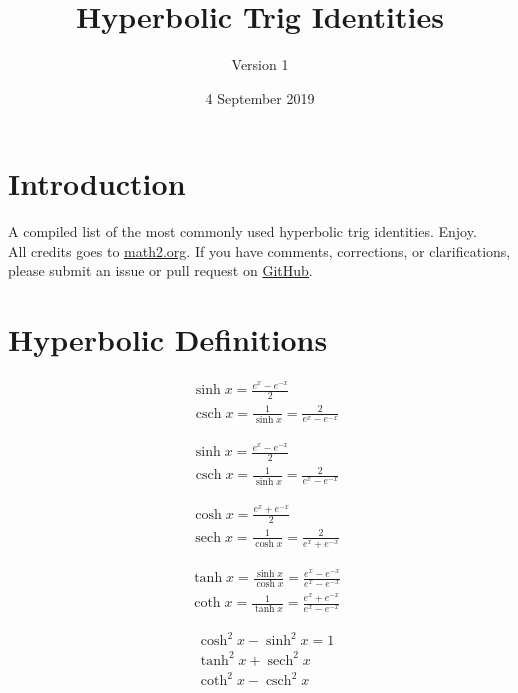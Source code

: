 \documentclass[11pt]{article}
\title{Hyperbolic Trig Identities}
\author{Version 1}
\date{4 September 2019}
\begin{document}
\maketitle

\section{Introduction}
A compiled list of the most commonly used hyperbolic trig identities. Enjoy. \\

All credits goes to \href{http://math2.org/math/trig/hyperbolics.htm}{math2.org}. If you have comments, corrections, or clarifications, please submit an issue or pull request on \href{https://github.com/chemclub/calculus}{GitHub}.


\section{Hyperbolic Definitions}

\begin{align*}
& \sinh x = \frac{e^x-e^{-x}}{2} \\ 
& \operatorname{csch}x = \frac{1}{\sinh x} = \frac{2}{e^x-e^{-x}}
\end{align*}

\begin{align*}
& \sinh x = \frac{e^x-e^{-x}}{2} \\
& \operatorname{csch}x = \frac{1}{\sinh x} = \frac{2}{e^x-e^{-x}}
\end{align*}

\begin{align*}
& \cosh x = \frac{e^x+e^{-x}}{2} \\
& \operatorname{sech}x = \frac{1}{\cosh x} = \frac{2}{e^x+e^{-x}}
\end{align*}

\begin{align*}
& \tanh x = \frac{\sinh x}{\cosh x} = \frac{e^x-e^{-x}}{e^x-e^{-x}} \\
& \operatorname{coth}x = \frac{1}{\tanh x} = \frac{e^x+e^{-x}}{e^x-e^{-x}}
\end{align*}


\begin{align*}
& \cosh^2x-\sinh^2x = 1 \\
& \tanh^2x+\operatorname{sech}^2x \\
& \coth^2x-\operatorname{csch}^2x
\end{align*}
\end{document}
